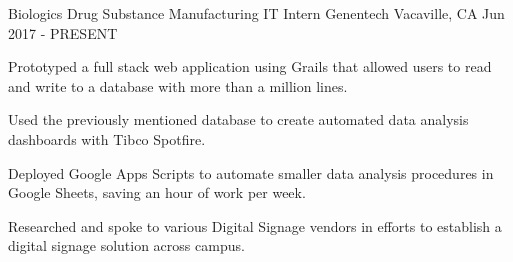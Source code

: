 

\begin{cventries}

  \cventry
    {Biologics Drug Substance Manufacturing IT Intern} %
    {Genentech} %
    {Vacaville, CA} %
    {Jun 2017 - PRESENT} %
    {
      \begin{cvitems} %
        \item {Prototyped a full stack web application using Grails that allowed users to read and write to a database with more than a million lines.}
        \item {Used the previously mentioned database to create automated data analysis dashboards with Tibco Spotfire.}
        \item {Deployed Google Apps Scripts to automate smaller data analysis procedures in Google Sheets, saving an hour of work per week.}
        \item {Researched and spoke to various Digital Signage vendors in efforts to establish a digital signage solution across campus.}
      \end{cvitems}
    }
\end{cventries}
